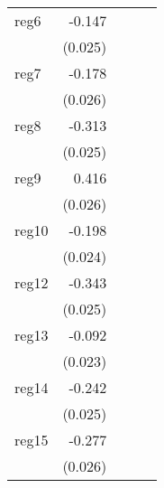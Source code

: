 {\begin{longtable}{l*{4}{D{.}{.}{-1}}}
\addlinespace
reg6        &      -0.147\sym{***}&                     &                     &                     \\
            &     (0.025)         &                     &                     &                     \\
\addlinespace
reg7        &      -0.178\sym{***}&                     &                     &                     \\
            &     (0.026)         &                     &                     &                     \\
\addlinespace
reg8        &      -0.313\sym{***}&                     &                     &                     \\
            &     (0.025)         &                     &                     &                     \\
\addlinespace
reg9        &       0.416\sym{***}&                     &                     &                     \\
            &     (0.026)         &                     &                     &                     \\
\addlinespace
reg10       &      -0.198\sym{***}&                     &                     &                     \\
            &     (0.024)         &                     &                     &                     \\
\addlinespace
reg12       &      -0.343\sym{***}&                     &                     &                     \\
            &     (0.025)         &                     &                     &                     \\
\addlinespace
reg13       &      -0.092\sym{***}&                     &                     &                     \\
            &     (0.023)         &                     &                     &                     \\
\addlinespace
reg14       &      -0.242\sym{***}&                     &                     &                     \\
            &     (0.025)         &                     &                     &                     \\
\addlinespace
reg15       &      -0.277\sym{***}&                     &                     &                     \\
            &     (0.026)         &                     &                     &                     \\

\end{longtable}}
